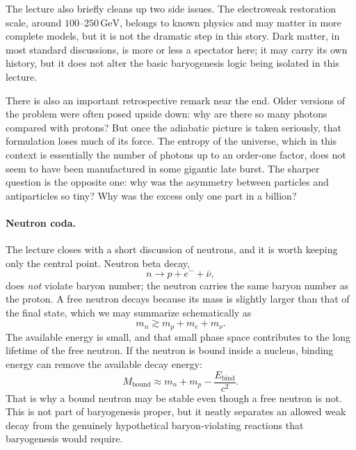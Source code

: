 The lecture also briefly cleans up two side issues. The electroweak restoration scale, around \(100\)--\(250\,\mathrm{GeV}\), belongs to known physics and may matter in more complete models, but it is not the dramatic step in this story. Dark matter, in most standard discussions, is more or less a spectator here; it may carry its own history, but it does not alter the basic baryogenesis logic being isolated in this lecture.

There is also an important retrospective remark near the end. Older versions of the problem were often posed upside down: why are there so many photons compared with protons? But once the adiabatic picture is taken seriously, that formulation loses much of its force. The entropy of the universe, which in this context is essentially the number of photons up to an order-one factor, does not seem to have been manufactured in some gigantic late burst. The sharper question is the opposite one: why was the asymmetry between particles and antiparticles so tiny? Why was the excess only one part in a billion?

\paragraph{Neutron coda.} The lecture closes with a short discussion of neutrons, and it is worth keeping only the central point. Neutron beta decay,
\begin{equation}
n\to p+e^-+\bar\nu,
\end{equation}
does \emph{not} violate baryon number; the neutron carries the same baryon number as the proton. A free neutron decays because its mass is slightly larger than that of the final state, which we may summarize schematically as
\begin{equation}
m_n \gtrsim m_p+m_e+m_\nu.
\end{equation}
The available energy is small, and that small phase space contributes to the long lifetime of the free neutron. If the neutron is bound inside a nucleus, binding energy can remove the available decay energy:
\begin{equation}
M_{\mathrm{bound}} \approx m_n+m_p-\frac{E_{\mathrm{bind}}}{c^2}.
\end{equation}
That is why a bound neutron may be stable even though a free neutron is not. This is not part of baryogenesis proper, but it neatly separates an allowed weak decay from the genuinely hypothetical baryon-violating reactions that baryogenesis would require.

